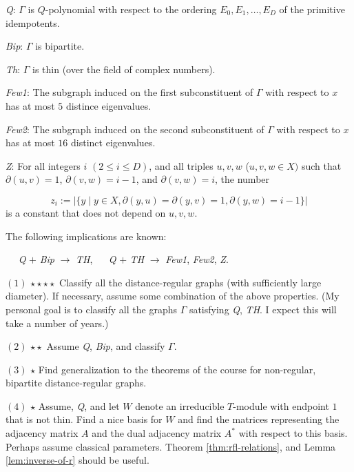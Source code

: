 \documentclass[
]{book}
\theoremstyle{definition}
\theoremstyle{definition}
\theoremstyle{definition}
\theoremstyle{definition}
\theoremstyle{remark}
\begin{document}
\hfill\break
\emph{Q}: \(\Gamma\) is \(Q\)-polynomial with respect to the ordering \(E_0, E_1, \ldots, E_D\) of the primitive idempotents.

\hfill\break
\emph{Bip}: \(\Gamma\) is bipartite.

\hfill\break
\emph{Th}: \(\Gamma\) is thin (over the field of complex numbers).

\hfill\break
\emph{Few1}: The subgraph induced on the first subconstituent of \(\Gamma\) with respect to \(x\) has at most \(5\) distince eigenvalues.

\hfill\break
\emph{Few2}: The subgraph induced on the second subconstituent of \(\Gamma\) with respect to \(x\) has at most \(16\) distinct eigenvalues.

\hfill\break
\emph{Z}: For all integers \(i\) \((2\leq i\leq D)\), and all triples \(u, v, w\) (\(u,v, w\in X)\) such that \(\partial(u,v) = 1\), \(\partial(v,w) = i-1\), and \(\partial(v,w) = i\), the number

\[z_i:=|\{y\mid y\in X, \partial(y,u) = \partial(y,v) =1, \partial(y,w) = i-1\}|\]
is a constant that does not depend on \(u,v,w\).

The following implications are known:

\(\quad\) \emph{Q} \(+\) \emph{Bip} \(\to\) \emph{TH}, \(\quad\) \emph{Q} \(+\) \emph{TH} \(\to\) \emph{Few1}, \emph{Few2}, \emph{Z}.

\((1)\) \(\star\star\)\(\star\star\) Classify all the distance-regular graphs (with sufficiently large diameter). If necessary, assume some combination of the above properties. (My personal goal is to classify all the graphs \(\Gamma\) satisfying \emph{Q}, \emph{TH}. I expect this will take a number of years.)

\hfill\break
\((2)\) \(\star\star\) Assume \emph{Q}, \emph{Bip}, and classify \(\Gamma\).

\hfill\break
\((3)\) \(\star\) Find generalization to the theorems of the course for non-regular, bipartite distance-regular graphs.

\hfill\break
\((4)\) \(\star\) Assume, \emph{Q}, and let \(W\) denote an irreducible \(T\)-module with endpoint \(1\) that is not thin. Find a nice basis for \(W\) and find the matrices representing the adjacency matrix \(A\) and the dual adjacency matrix \(A^*\) with respect to this basis. Perhaps assume classical parameters. Theorem \ref{thm:rfl-relations}, and Lemma \ref{lem:inverse-of-r} should be useful.
\end{document}
